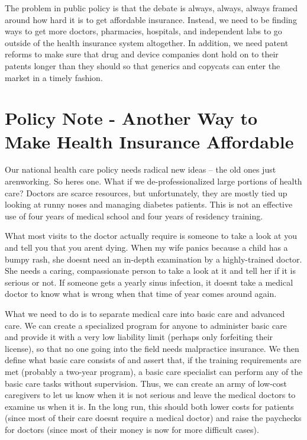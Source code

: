 The problem in public policy is that the debate is always, always,
always framed around how hard it is to get affordable insurance.
Instead, we need to be finding ways to get more doctors, pharmacies,
hospitals, and independent labs
to go outside of the
health insurance system altogether. In addition, we need patent reforms
to make sure that drug and device companies don{\textquotesingle}t hold
on to their patents longer than they should so that generics and
copycats can enter the market in a timely fashion.

\section{Policy Note - Another Way to Make Health Insurance
Affordable}

Our national health
care policy needs radical new ideas – the old ones just
aren{\textquotesinglet working.  So here{\textquotesingle}s one.  What
if we
}de-professionalized
large portions of
health care? Doctors
are scarce resources, but unfortunately, they are mostly tied up
looking at runny noses and managing diabetes patients. This is not an
effective use of four years of medical school and four years of
residency training.


What most visits to the doctor actually require is someone to take a
look at you and tell you that you aren{\textquotesingle}t dying. When
my wife panics because a child has a bumpy rash, she
doesn{\textquotesingle}t need an in-depth examination by a
highly-trained doctor. She needs a caring, compassionate person to take
a look at it and tell her if it is serious or not. If someone gets a
yearly sinus infection, it doesn{\textquotesingle}t take a medical
doctor to know what is wrong when that time of year comes around again.



What we need to do is to separate medical care into {\textquotedbl}basic
care{\textquotedbl} and {\textquotedbl}advanced care.{\textquotedbl} We
can create a specialized program for anyone to administer
{\textquotedbl}basic care{\textquotedbl} and provide it with a very low
liability limit (perhaps only forfeiting their license), so that no one
going into the field needs malpractice insurance. We then define what
{\textquotedbl}basic care{\textquotedbl} consists of and assert that,
if the training requirements are met (probably a two-year program), a
basic care specialist can perform any of the basic care tasks without
supervision. Thus, we can create an army of low-cost caregivers to let
us know when it is not serious and leave the medical doctors to examine
us when it is. In the long run, this should both lower costs for
patients (since most of their care doesn{\textquotesingle}t require a
medical doctor) and raise the paychecks for doctors (since most of
their money is now for more difficult cases).

